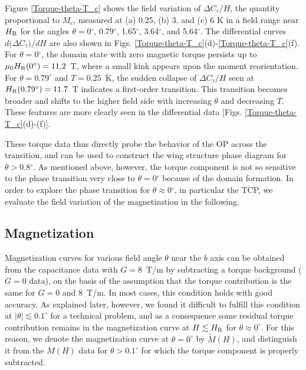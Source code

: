 \documentclass[twocolumn, aps, superscriptaddress, amsfonts,floatfix]{revtex4}%
\begin{document}
{Figure \ref{Torque-theta-T_c} shows the field variation of $\Delta C_{\tau}/H$, the quantity proportional to $M_c$, measured at (a) 0.25, (b) 3, and  (c) 6 K in a field range near $H_{\rm R}$ for the angles $\theta = 0$$^\circ$, 0.79$^\circ$, 1.65$^\circ$, 3.64$^\circ$, and 5.64$^\circ$. 
The differential curves $d(\Delta$$C_{\tau})$$/dH$ are also shown in Figs. \ref{Torque-theta-T_c}(d)-\ref{Torque-theta-T_c}(f).
For $\theta = 0$$^\circ$, the domain state with zero magnetic torque persists up to $\mu_0H_{\rm R}(0^\circ )=11.2$~T, where a small kink appears upon the moment reorientation.
 For $\theta =0.79^\circ$ and $T=0.25$~K, the sudden collapse of $\Delta C_{\tau}/H$ seen at $H_{\rm R}(0.79^\circ)=11.7$~T    indicates a first-order transition. This transition becomes broader and shifts to the higher field side with increasing $\theta$ and decreasing $T$.
These features are more clearly seen in the differential data [Figs. \ref{Torque-theta-T_c}(d)-(f)].

These torque data thus directly probe the behavior of the OP across the transition, and can be used to construct the wing structure phase diagram for $\theta > 0.8$$^\circ$.
As mentioned above, however, the torque component is not  so sensitive to the phase transition very close to $\theta = 0$$^\circ$ because of the domain formation.
In order to explore the phase transition for $\theta \approx 0$$^\circ$, in particular the TCP, we evaluate the field variation of the magnetization  in the following.



\color{black}


\subsection{Magnetization}

 
Magnetization curves for various field angle $\theta$ near the $b$ axis can be obtained from the capacitance data with $G=8$~T/m by subtracting a torque background ($G=0$ data), on the basis of the assumption that the torque contribution is the same for $G=0$ and 8~T/m. In most cases, this condition holds with  good accuracy. As explained later, however, we found  it  difficult to fulfill this condition at $|\theta|\lesssim 0.1^\circ$ for a technical problem, and as a consequence some residual torque contribution remains in the magnetization curve at $H\lesssim H_{\rm R}$ for $\theta\approx 0^\circ$. For this reason, we denote the magnetization curve at $\theta=0^\circ$ by $\tilde{M}(H)$, and distinguish it from the $M(H)$ data for $\theta>0.1^\circ$ for which the torque component is properly subtracted.
 
}
\end{document}

